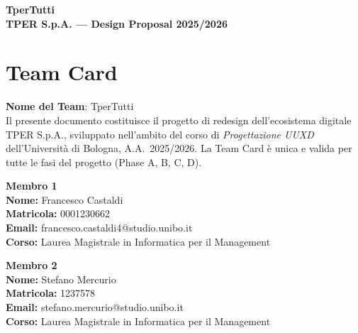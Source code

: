 ﻿\documentclass[11pt,a4paper]{article}
\begin{document}
\begin{tcolorbox}[colback=primaryColor,colframe=primaryColor,arc=1.5mm,halign=center,valign=center,height=2.5cm]
    \color{white}\LARGE\bfseries\sffamily TperTutti \\[0.2cm]
    \color{white!80}\small\sffamily TPER S.p.A. --- Design Proposal 2025/2026
\end{tcolorbox}

\vspace{0.3cm}

\section*{Team Card}

\vspace{0.2cm}

\begin{tcolorbox}[base]
\small
\textbf{Nome del Team}: TperTutti \\[6pt]
Il presente documento costituisce il progetto di redesign dell'ecosistema digitale TPER S.p.A., 
sviluppato nell'ambito del corso di \textit{Progettazione UUXD} dell'Università di Bologna, 
A.A.\ 2025/2026. La Team Card è unica e valida per tutte le fasi del progetto (Phase A, B, C, D).
\end{tcolorbox}

\vspace{0.3cm}

\begin{minipage}[t]{0.48\textwidth}
\begin{tcolorbox}[personabox]
    \textbf{Membro 1} \\[4pt]
    \textbf{Nome:} Francesco Castaldi \\[2pt]
    \textbf{Matricola:} 0001230662 \\[2pt]
    \textbf{Email:} francesco.castaldi4@studio.unibo.it \\[2pt]
    \textbf{Corso:} Laurea Magistrale in Informatica per il Management
\end{tcolorbox}
\end{minipage}
\hfill
\begin{minipage}[t]{0.48\textwidth}
\begin{tcolorbox}[personabox]
    \textbf{Membro 2} \\[4pt]
    \textbf{Nome:} Stefano Mercurio \\[2pt]
    \textbf{Matricola:} 1237578 \\[2pt]
    \textbf{Email:} stefano.mercurio@studio.unibo.it \\[2pt]
    \textbf{Corso:} Laurea Magistrale in Informatica per il Management
\end{tcolorbox}
\end{minipage}
\end{document}
